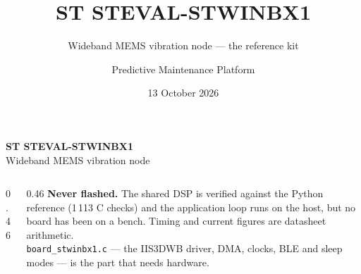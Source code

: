 \documentclass[aspectratio=169,10pt]{beamer}
\title[STWIN.box node]{ST STEVAL-STWINBX1}
\subtitle{Wideband MEMS vibration node --- the reference kit}
\author{Predictive Maintenance Platform}
\date{13 October 2026}
\begin{document}
\begin{frame}[plain]
  \vspace{5mm}
  {\LARGE\bfseries ST STEVAL-STWINBX1}\\[2mm]
  {\large\color{pdmink2} Wideband MEMS vibration node}\par
  \vspace{5mm}\noindent{\color{pdmrule}\rule{\linewidth}{0.4pt}}\par
  \vspace{3mm}
  \begin{columns}[T]
    \begin{column}{0.46\textwidth}
      \scriptsize
      \\[1mm]
      \\[1mm]
      \\[1mm]
      \\[1mm]
      \\[1mm]
    \end{column}
    \begin{column}{0.46\textwidth}
      \scriptsize\color{pdmink2}
      \textbf{Never flashed.} The shared DSP is verified against the Python
      reference (1\,113 C checks) and the application loop runs on the host, but
      no board has been on a bench. Timing and current figures are datasheet
      arithmetic.
      \\[2mm]
      \texttt{board\_stwinbx1.c} --- the IIS3DWB driver, DMA, clocks, BLE and
      sleep modes --- is the part that needs hardware.
    \end{column}
  \end{columns}
\end{frame}
\end{document}
